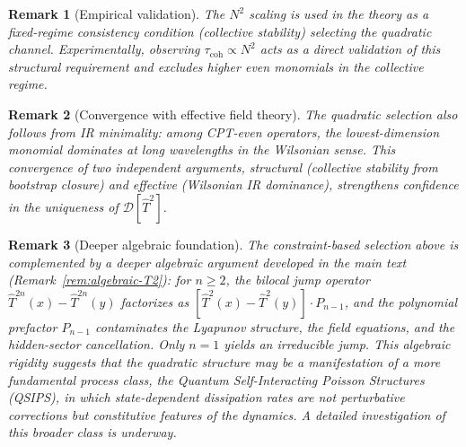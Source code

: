 \documentclass[12pt,a4paper]{article}
\newtheorem{remark}{Remark}[section]
\numberwithin{equation}{section}
\begin{document}
\begin{remark}[Empirical validation]
The $N^2$ scaling is used in the theory as a fixed-regime consistency condition (collective stability) selecting the quadratic channel. Experimentally, observing $\tau_{\mathrm{coh}} \propto N^2$ acts as a direct validation of this structural requirement and excludes higher even monomials in the collective regime.
\end{remark}

\begin{remark}[Convergence with effective field theory]
The quadratic selection also follows from IR minimality: among CPT-even operators, the lowest-dimension monomial dominates at long wavelengths in the Wilsonian sense. This convergence of two independent arguments, structural (collective stability from bootstrap closure) and effective (Wilsonian IR dominance), strengthens confidence in the uniqueness of $\mathcal{D}[\hat T^2]$.
\end{remark}

\begin{remark}[Deeper algebraic foundation]
The constraint-based selection above is complemented by a deeper algebraic argument developed in the main text (Remark~\ref{rem:algebraic-T2}): for $n \ge 2$, the bilocal jump operator $\hat T^{2n}(x) - \hat T^{2n}(y)$ factorizes as $[\hat T^2(x) - \hat T^2(y)] \cdot P_{n-1}$, and the polynomial prefactor $P_{n-1}$ contaminates the Lyapunov structure, the field equations, and the hidden-sector cancellation. Only $n = 1$ yields an \emph{irreducible} jump. This algebraic rigidity suggests that the quadratic structure may be a manifestation of a more fundamental process class, the Quantum Self-Interacting Poisson Structures (QSIPS), in which state-dependent dissipation rates are not perturbative corrections but constitutive features of the dynamics. A detailed investigation of this broader class is underway.
\end{remark}

\endgroup
\end{document}
